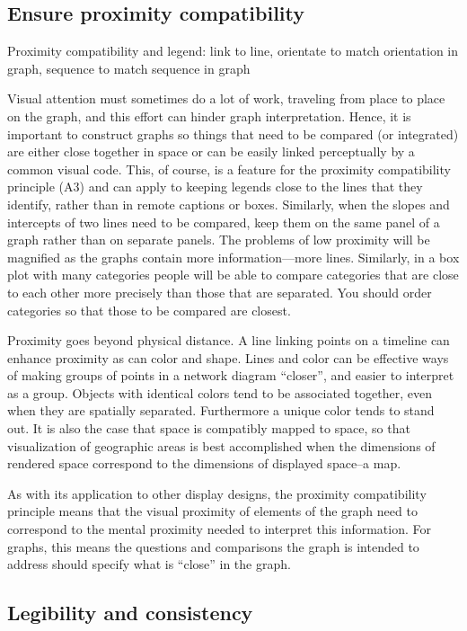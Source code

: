 \documentclass[]{krantz}
\theoremstyle{definition}
\theoremstyle{definition}
\theoremstyle{definition}
\theoremstyle{remark}
\begin{document}
\subsection{Ensure proximity
compatibility}\label{ensure-proximity-compatibility}

Proximity compatibility and legend: link to line, orientate to match
orientation in graph, sequence to match sequence in graph

Visual attention must sometimes do a lot of work, traveling from place
to place on the graph, and this effort can hinder graph interpretation.
Hence, it is important to construct graphs so things that need to be
compared (or integrated) are either close together in space or can be
easily linked perceptually by a common visual code. This, of course, is
a feature for the proximity compatibility principle (A3) and can apply
to keeping legends close to the lines that they identify, rather than in
remote captions or boxes. Similarly, when the slopes and intercepts of
two lines need to be compared, keep them on the same panel of a graph
rather than on separate panels. The problems of low proximity will be
magnified as the graphs contain more information---more lines.
Similarly, in a box plot with many categories people will be able to
compare categories that are close to each other more precisely than
those that are separated. You should order categories so that those to
be compared are closest.

Proximity goes beyond physical distance. A line linking points on a
timeline can enhance proximity as can color and shape. Lines and color
can be effective ways of making groups of points in a network diagram
``closer'', and easier to interpret as a group. Objects with identical
colors tend to be associated together, even when they are spatially
separated. Furthermore a unique color tends to stand out. It is also the
case that space is compatibly mapped to space, so that visualization of
geographic areas is best accomplished when the dimensions of rendered
space correspond to the dimensions of displayed space--a map.

As with its application to other display designs, the proximity
compatibility principle means that the visual proximity of elements of
the graph need to correspond to the mental proximity needed to interpret
this information. For graphs, this means the questions and comparisons
the graph is intended to address should specify what is ``close'' in the
graph.

\subsection{Legibility and
consistency}\label{legibility-and-consistency}
\end{document}
